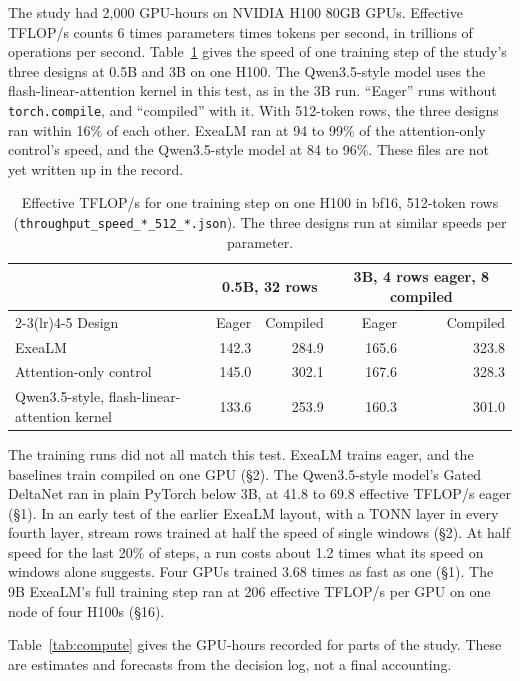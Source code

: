 \documentclass[10pt,twocolumn,letterpaper]{article}
\newcommand{\sect}[1]{\S#1}
\begin{document}
The study had 2,000 GPU-hours on NVIDIA H100 80GB GPUs.
Effective TFLOP/s counts 6 times parameters times tokens per second, in trillions of operations per second.
Table~\ref{tab:speed} gives the speed of one training step of the study's three designs at 0.5B and 3B on one H100.
The Qwen3.5-style model uses the flash-linear-attention kernel in this test, as in the 3B run.
``Eager'' runs without \texttt{torch.compile}, and ``compiled'' with it.
With 512-token rows, the three designs ran within 16\% of each other.
ExeaLM ran at 94 to 99\% of the attention-only control's speed, and the Qwen3.5-style model at 84 to 96\%.
These files are not yet written up in the record.

\begin{table}[h]
\centering\small
\caption{Effective TFLOP/s for one training step on one H100 in bf16, 512-token rows (\texttt{throughput\_speed\_*\_512\_*.json}). The three designs run at similar speeds per parameter.}
\label{tab:speed}
\begin{tabular}{@{}l r r r r@{}}
\toprule
& \multicolumn{2}{c}{0.5B, 32 rows} & \multicolumn{2}{c}{3B, 4 rows eager, 8 compiled} \\
\cmidrule(lr){2-3}\cmidrule(lr){4-5}
Design & Eager & Compiled & Eager & Compiled \\
\midrule
ExeaLM & 142.3 & 284.9 & 165.6 & 323.8 \\
Attention-only control & 145.0 & 302.1 & 167.6 & 328.3 \\
Qwen3.5-style, flash-linear-attention kernel & 133.6 & 253.9 & 160.3 & 301.0 \\
\bottomrule
\end{tabular}
\end{table}

The training runs did not all match this test.
ExeaLM trains eager, and the baselines train compiled on one GPU (\sect{2}).
The Qwen3.5-style model's Gated DeltaNet ran in plain PyTorch below 3B, at 41.8 to 69.8 effective TFLOP/s eager (\sect{1}).
In an early test of the earlier ExeaLM layout, with a TONN layer in every fourth layer, stream rows trained at half the speed of single windows (\sect{2}).
At half speed for the last 20\% of steps, a run costs about 1.2 times what its speed on windows alone suggests.
Four GPUs trained 3.68 times as fast as one (\sect{1}).
The 9B ExeaLM's full training step ran at 206 effective TFLOP/s per GPU on one node of four H100s (\sect{16}).

Table~\ref{tab:compute} gives the GPU-hours recorded for parts of the study.
These are estimates and forecasts from the decision log, not a final accounting.
\end{document}
